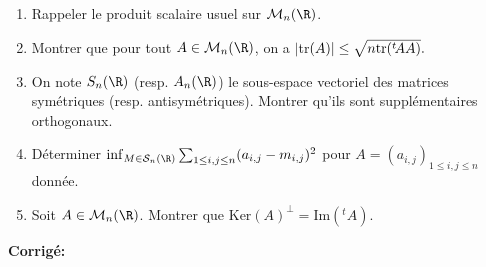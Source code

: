 \documentclass[a4paper,twoside,french,11pt]{VcCours}
\newcommand{\corr}{\textbf{Corrigé:}}
\begin{document}
\begin{Exercice}{} \begin{enumerate}
	\item Rappeler le produit scalaire usuel sur ${\cal M}_n(\R)$.
	

\item Montrer que pour tout $A\in{\cal M}_n(\R)$, on a  $|$tr$(A)|\leq \sqrt{n\hbox{tr}(^t\!AA)}.$
	
\item On note $S_n(\R)$ (resp. $A_n(\R)$)	le sous-espace vectoriel des matrices symétriques (resp. antisymétriques). Montrer qu'ils sont supplémentaires orthogonaux.

\item Déterminer $\inf_{M\in{\cal S}_n(\R)}\sum_{1 \leq i,j \leq n}(a_{i,j}-m_{i,j})^2$ pour $A=(a_{i,j})_{1 \leq i,j \leq n}$ donnée.
\item Soit $A\in{\cal M}_n(\R)$. Montrer que $\textrm{Ker}(A)^{\perp}= \textrm{Im}(^t\!A)$.
\end{enumerate}
\end{Exercice}

\corr 
\end{document}
